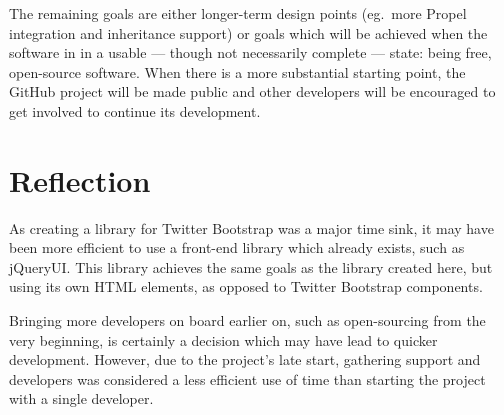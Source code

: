 The remaining goals are either longer-term design points (eg.\ more Propel integration and inheritance support) or goals which will be achieved when the software in in a usable --- though not necessarily complete --- state: being free, open-source software. When there is a more substantial starting point, the GitHub project will be made public and other developers will be encouraged to get involved to continue its development.

\section{Reflection}
As creating a library for Twitter Bootstrap was a major time sink, it may have been more efficient to use a front-end library which already exists, such as jQueryUI. This library achieves the same goals as the library created here, but using its own HTML elements, as opposed to Twitter Bootstrap components.

Bringing more developers on board earlier on, such as open-sourcing from the very beginning, is certainly a decision which may have lead to quicker development. However, due to the project's late start, gathering support and developers was considered a less efficient use of time than starting the project with a single developer.




